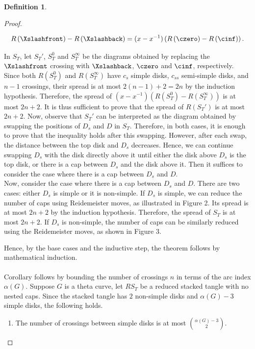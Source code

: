\documentclass{article}
\theoremstyle{definition}
\newtheorem{defn}[thm]{Definition}
\theoremstyle{theorem}
\theoremstyle{proposition}
\theoremstyle{corollary}
\begin{document}
\begin{defn}
\begin{proof}
\begin{enumerate}
        \[ R \left( \Xslashfront \right) - R \left( \Xslashback \right) = (x - x^{-1}) \left( R \left( \czero \right) - R \left ( \cinf \right) \right). \]

        In $S_T$, let $S_T'$, $S_T^0$ and $S_T^\infty$ be the diagrams obtained by replacing the $\Xslashfront$ crossing with $\Xslashback$, $\czero$ and $\cinf$, respectively. Since both $R \left( S_T^0 \right)$ and $R \left ( S_T^\infty \right)$ have $c_s$ simple disks, $c_{ss}$ semi-simple disks, and $n-1$ crossings, their spread is at most $2(n-1)+2=2n$ by the induction hypothesis. Therefore, the spread of $(x - x^{-1}) \left( R \left( S_T^0 \right) - R \left ( S_T^\infty \right) \right)$ is at most $2n+2$. It is thus sufficient to prove that the spread of $R \left ( S_T' \right)$ is at most $2n+2$. Now, observe that $S_T'$ can be interpreted as the diagram obtained by swapping the positions of $D_s$ and $D$ in $S_T$. Therefore, in both cases, it is enough to prove that the inequality holds after this swapping. However, after each swap, the distance between the top disk and $D_s$ decreases. Hence, we can continue swapping $D_s$ with the disk directly above it until either the disk above $D_s$ is the top disk, or there is a cap between $D_s$ and the disk above it. Then it suffices to consider the case where there is a cap between $D_s$ and $D$. \\
        Now, consider the case where there is a cap between $D_s$ and $D$. There are two cases: either $D_s$ is simple or it is non-simple. If $D_s$ is simple, we can reduce the number of caps using Reidemeister moves, as illustrated in Figure 2. Its spread is at most $2n+2$ by the induction hypothesis. Therefore, the spread of $S_T$ is at most $2n+2$. If $D_s$ is non-simple, the number of caps can be similarly reduced using the Reidemeister moves, as shown in Figure 3. \\
    \end{enumerate}
    Hence, by the base cases and the inductive step, the theorem follows by mathematical induction. \\ \\
    Corollary follows by bounding the number of crossings $n$ in terms of the arc index $\alpha(G)$. Suppose $G$ is a theta curve, let $RS_T$ be a reduced stacked tangle with no nested caps. Since the stacked tangle has $2$ non-simple disks and $\alpha(G)-3$ simple disks, the following holds.
    \begin{enumerate}
        \item The number of crossings between simple disks is at most $\binom{\alpha(G)-3}{2}$.

\end{enumerate}
\end{proof}
\end{defn}
\end{document}
